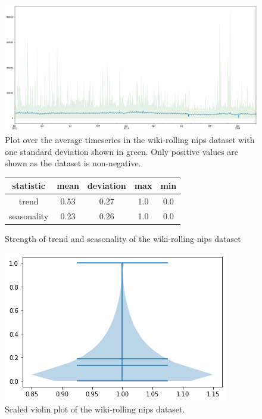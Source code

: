 \begin{figure}[htb]
    \centering
      \includegraphics[width=\linewidth]{4_designing/figures/wiki-rolling_nips_plot.png}
      \caption{Plot over the average timeseries in the wiki-rolling nips dataset with one standard deviation shown in green. Only positive values are shown as the dataset is non-negative.}
      \label{fig:wiki-rolling_nips_plot}
    \endminipage\hfill
\end{figure}

\begin{figure}[htb]
    \centering
        \begin{center}
            \begin{tabular}{||c | c | c | c | c |} 
                \hline
                statistic & mean & deviation & max & min\\
                \hline
                trend & 0.53 & 0.27 & 1.0 & 0.0 \\
                \hline
                seasonality & 0.23 & 0.26 & 1.0 & 0.0 \\
                \hline
                \hline
            \end{tabular}
            \caption{Strength of trend and seasonality of the wiki-rolling nips dataset}
        \end{center}
    \endminipage\hfill
      \includegraphics[width=\linewidth]{4_designing/figures/wiki-rolling_nips_violin.png}
      \caption{Scaled violin plot of the wiki-rolling nips dataset.}
      \label{fig:wiki-rolling_nips_violin}
    \endminipage\hfill
\end{figure}


